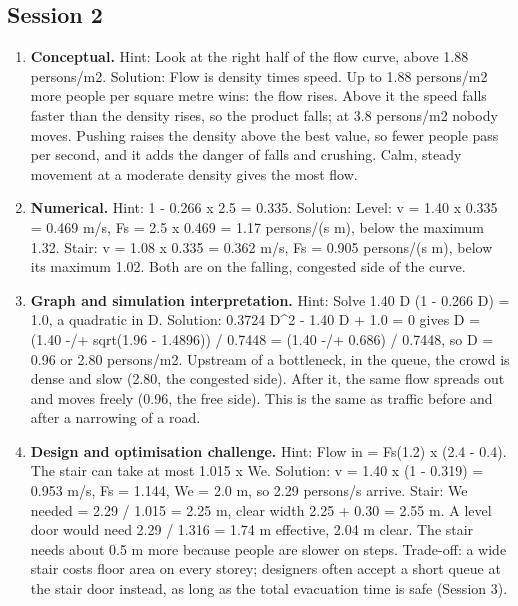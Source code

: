 \documentclass[11pt,a4paper]{article}
\begin{document}
\subsection*{Session 2}
\begin{enumerate}[nosep]
\item \textbf{Conceptual.} Hint: Look at the right half of the flow curve, above 1.88 persons/m2. Solution: Flow is density times speed. Up to 1.88 persons/m2 more people per square metre wins: the flow rises. Above it the speed falls faster than the density rises, so the product falls; at 3.8 persons/m2 nobody moves. Pushing raises the density above the best value, so fewer people pass per second, and it adds the danger of falls and crushing. Calm, steady movement at a moderate density gives the most flow.
\item \textbf{Numerical.} Hint: 1 - 0.266 x 2.5 = 0.335. Solution: Level: v = 1.40 x 0.335 = 0.469 m/s, Fs = 2.5 x 0.469 = 1.17 persons/(s m), below the maximum 1.32. Stair: v = 1.08 x 0.335 = 0.362 m/s, Fs = 0.905 persons/(s m), below its maximum 1.02. Both are on the falling, congested side of the curve.
\item \textbf{Graph and simulation interpretation.} Hint: Solve 1.40 D (1 - 0.266 D) = 1.0, a quadratic in D. Solution: 0.3724 D\textasciicircum{}2 - 1.40 D + 1.0 = 0 gives D = (1.40 -/+ sqrt(1.96 - 1.4896)) / 0.7448 = (1.40 -/+ 0.686) / 0.7448, so D = 0.96 or 2.80 persons/m2. Upstream of a bottleneck, in the queue, the crowd is dense and slow (2.80, the congested side). After it, the same flow spreads out and moves freely (0.96, the free side). This is the same as traffic before and after a narrowing of a road.
\item \textbf{Design and optimisation challenge.} Hint: Flow in = Fs(1.2) x (2.4 - 0.4). The stair can take at most 1.015 x We. Solution: v = 1.40 x (1 - 0.319) = 0.953 m/s, Fs = 1.144, We = 2.0 m, so 2.29 persons/s arrive. Stair: We needed = 2.29 / 1.015 = 2.25 m, clear width 2.25 + 0.30 = 2.55 m. A level door would need 2.29 / 1.316 = 1.74 m effective, 2.04 m clear. The stair needs about 0.5 m more because people are slower on steps. Trade-off: a wide stair costs floor area on every storey; designers often accept a short queue at the stair door instead, as long as the total evacuation time is safe (Session 3).
\end{enumerate}
\end{document}
